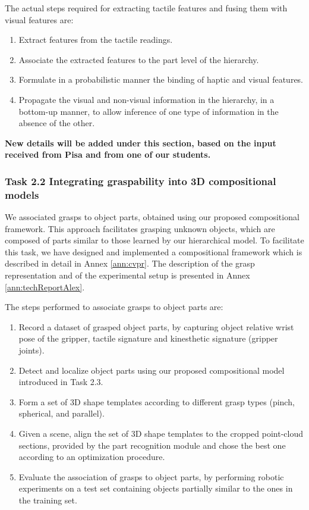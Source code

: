 \documentclass[a4paper,11pt,pdf]{../templates/pacmanreport}
\begin{document}
The actual steps required for extracting tactile features and fusing them with visual features are:
\begin{enumerate}

\item Extract features from the tactile readings.
\item Associate the extracted features to the part level of the hierarchy.
\item Formulate in a probabilistic manner the binding of haptic and visual features.
\item Propagate the visual and non-visual information in the
  hierarchy, in a bottom-up manner, to allow inference of one type of
  information in the absence of the other.
\end{enumerate}

\textbf{New details will be added under this section, based on the input received from Pisa and from one of our students.}

\subsubsection{Task 2.2 Integrating graspability into 3D compositional models}

We associated grasps to object parts, obtained using our proposed compositional framework. This approach facilitates grasping unknown objects, which are composed of parts similar to those learned by our hierarchical model. To facilitate this task, we have designed and implemented a compositional framework which is described in detail in Annex \ref{ann:cvpr}. The description of the grasp representation and of the experimental setup is presented in Annex \ref{ann:techReportAlex}.

The steps performed to associate grasps to object parts are:

\begin{enumerate}
\item Record a dataset of grasped object parts, by capturing object relative wrist pose of the gripper, tactile signature and kinesthetic signature (gripper joints).
\item Detect and localize object parts using our proposed compositional model introduced in Task 2.3.
\item Form a set of 3D shape templates according to different grasp types (pinch, spherical, and parallel).
\item Given a scene, align the set of 3D shape templates to the cropped point-cloud sections, provided by the part recognition module and chose the best one according to an optimization procedure.
\item Evaluate the association of grasps to object parts, by performing robotic experiments on a test set containing objects partially similar to the ones in the training set.
\end{enumerate}
\end{document}
